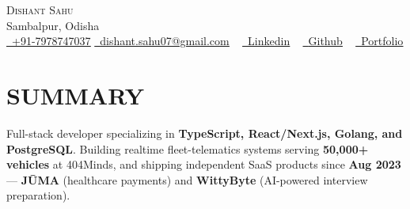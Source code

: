 \documentclass[letterpaper,11pt]{article}
\newcommand{\resumeSubHeadingListStart}{\begin{itemize}[leftmargin=0.0in, label={}]}
\newcommand{\resumeSubHeadingListEnd}{\end{itemize}}
\begin{document}


\begin{center}
    {\Huge \scshape Dishant Sahu} \\ \vspace{1pt}
   Sambalpur, Odisha \\ \vspace{1pt}
   \small \href{tel:+91-7978747037}{\raisebox{-0.1\height}\faPhone\ \underline{+91-7978747037}} \hspace{4pt}
\href{mailto:dishant.sahu07@gmail.com}{\raisebox{-0.2\height}\faEnvelope\ \underline{dishant.sahu07@gmail.com}} \hspace{4pt} ~
    \href{https://www.linkedin.com/in/dishant-sahu-b18240244/}{\raisebox{-0.2\height}\faLinkedinSquare\ \underline{Linkedin}}  ~
    \href{https://github.com/dishant-08}{\raisebox{-0.2\height}\faGithub\ \underline{Github}} ~
    \href{https://dishant-08.github.io}{\raisebox{-0.2\height}\faPoll\ \underline{Portfolio}}
    \vspace{-8pt}
\end{center}

\section{SUMMARY}
{\normalsize Full-stack developer specializing in \textbf{TypeScript, React/Next.js, Golang, and PostgreSQL}. Building realtime fleet-telematics systems serving \textbf{50,000+ vehicles} at 404Minds, and shipping independent SaaS products since \textbf{Aug 2023} --- \textbf{J\={U}MA} (healthcare payments) and \textbf{WittyByte} (AI-powered interview preparation).}
\vspace{-6pt}
\end{document}
